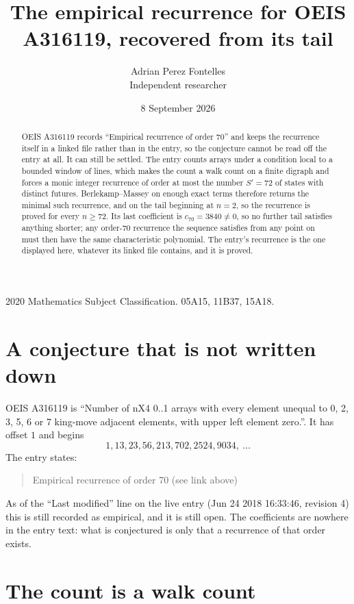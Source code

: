 \documentclass[11pt,a4paper]{article}
\title{The empirical recurrence for OEIS A316119, recovered from its tail}
\author{Adrian Perez Fontelles\\ \small Independent researcher}
\date{8 September 2026}
\theoremstyle{plain}
\theoremstyle{definition}
\begin{document}
\maketitle

\begin{abstract}
OEIS A316119 records ``Empirical recurrence of order $70$'' and keeps the recurrence itself in
a linked file rather than in the entry, so the conjecture cannot be read off the entry at all.
It can still be settled. The entry counts arrays under a condition local to a bounded window of
lines, which makes the count a walk count on a finite digraph and forces a monic integer
recurrence of order at most the number $S'=72$ of states with distinct futures. Berlekamp--Massey on
enough exact terms therefore returns the minimal such recurrence, and on the tail beginning at $n=2$, so the recurrence is proved for every $n\ge72$.
Its last coefficient is $c_{70}=3840\neq0$, so no further tail satisfies anything
shorter; any order-$70$ recurrence the sequence satisfies from any point on must then have
the same characteristic polynomial. The entry's recurrence is the one displayed here, whatever
its linked file contains, and it is proved.
\end{abstract}

\noindent\small 2020 Mathematics Subject Classification. 05A15, 11B37, 15A18.\normalsize

\section{A conjecture that is not written down}

OEIS A316119 is ``Number of nX4 0..1 arrays with every element unequal to 0, 2, 3, 5, 6 or 7 king-move adjacent elements, with upper left element zero.''. It has offset $1$ and begins
\[
1, 13, 23, 56, 213, 702, 2524, 9034,\ \dots
\]
The entry states:
\begin{quote}
Empirical recurrence of order 70 (see link above)
\end{quote}
As of the ``Last modified'' line on the live entry (Jun 24 2018 16:33:46, revision 4)
this is still recorded as empirical, and it is still open. The coefficients are nowhere in the
entry text: what is conjectured is only that a recurrence of that order exists.

\section{The count is a walk count}
\end{document}

